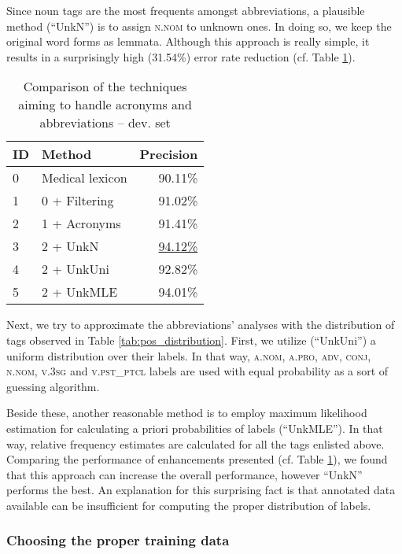 Since noun tags are the most frequents amongst abbreviations, a plausible method (``UnkN'') is to assign \textsc{n.nom} to unknown ones. 
In doing so, we keep the original word forms as lemmata. 
Although this approach is really simple, it results in a surprisingly high (31.54\%) error rate reduction (cf. Table \ref{tab:abbrev_fixes}). 

\begin{table}[H]
\centering
\caption{Comparison of the techniques aiming to handle acronyms and abbreviations --  dev. set}
\label{tab:abbrev_fixes}
\begin{tabular}{ l l r } 
\hline
ID & Method &  Precision \\
\hline
0 & Medical lexicon & 90.11\% \\
1 & 0 + Filtering & 91.02\% \\
2 & 1 + Acronyms & 91.41\% \\
3 & 2 + UnkN & \underline{94.12\%} \\
4 & 2 + UnkUni & 92.82\% \\
5 & 2 + UnkMLE & 94.01\% \\
\hline
\end{tabular}
\end{table}

Next, we try to approximate the abbreviations' analyses with the distribution of tags observed in Table \ref{tab:pos_distribution}. 
First, we utilize (``UnkUni'') a uniform distribution over their labels. %
In that way, \textsc{a.nom}, \textsc{a.pro}, \textsc{adv}, \textsc{conj}, \textsc{n.nom}, \textsc{v.3sg} and \textsc{v.pst\_ptcl} labels are used with equal probability as a sort of guessing algorithm.

Beside these, another reasonable method is to employ maximum likelihood estimation for calculating a priori probabilities of labels (``UnkMLE''). 
In that way, relative frequency estimates are calculated for all the tags enlisted above.
Comparing the performance of enhancements presented (cf. Table \ref{tab:abbrev_fixes}), we found that this approach can increase the overall performance, however ``UnkN'' performs the best.
An explanation for this surprising fact is that annotated data available can be insufficient for computing the proper distribution of labels.



\subsubsection{Choosing the proper training data}


